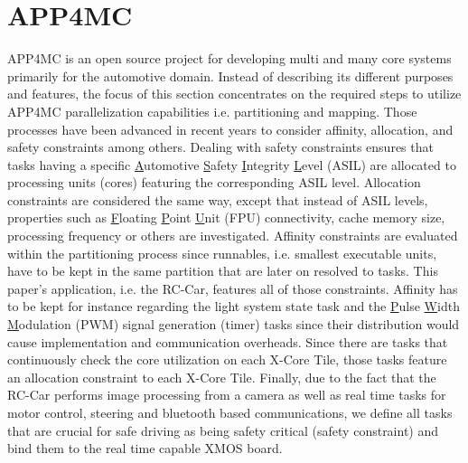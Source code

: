 \documentclass [a4paper,final,conference,10pt]{IDAACS}
\begin{document}
\section{APP4MC}
\label{sec:app4mc}
APP4MC is an open source project for developing multi and many core systems primarily for the automotive domain. Instead of describing its different purposes and features, the focus of this section concentrates on the required steps to utilize APP4MC parallelization capabilities \cite{ICPDSSE} i.e. partitioning and mapping. Those processes have been advanced in recent years to consider affinity, allocation, and safety constraints among others. Dealing with safety constraints ensures that tasks having a specific \underline{A}utomotive \underline{S}afety \underline{I}ntegrity \underline{L}evel (ASIL) are allocated to processing units (cores) featuring the corresponding ASIL level. Allocation constraints are considered the same way, except that instead of ASIL levels, properties such as \underline{F}loating \underline{P}oint \underline{U}nit (FPU) connectivity, cache memory size, processing frequency or others are investigated. Affinity constraints are evaluated within the partitioning process since runnables, i.e. smallest executable units, have to be kept in the same partition that are later on resolved to tasks. This paper's application, i.e. the RC-Car, features all of those constraints. Affinity has to be kept for instance regarding the light system state task and the \underline{P}ulse \underline{W}idth \underline{M}odulation (PWM) signal generation (timer) tasks since their distribution would cause implementation and communication overheads. Since there are tasks that continuously check the core utilization on each X-Core Tile, those tasks feature an allocation constraint to each X-Core Tile. Finally, due to the fact that the RC-Car performs image processing from a camera as well as real time tasks for motor control, steering and bluetooth based communications, we define all tasks that are crucial for safe driving as being safety critical (safety constraint) and bind them to the real time capable XMOS board. 
\end{document}
